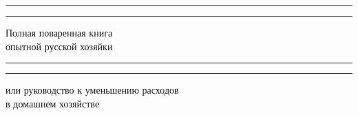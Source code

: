 \documentclass[a4paper,12pt]{extbook}
\begin{document}
\begin{titlepage} %

	\centering %
	
	\scshape %
	
	\vspace*{\baselineskip} %
	
	
	\rule{\textwidth}{1.6pt}\vspace*{-\baselineskip}\vspace*{2pt} %
	\rule{\textwidth}{0.4pt} %
	
	\vspace{0.75\baselineskip} %
	
	{\LARGE  Полная поваренная книга \\ опытной русской хозяйки } %
	
	\vspace{0.75\baselineskip} %
	
	\rule{\textwidth}{0.4pt}\vspace*{-\baselineskip}\vspace{3.2pt} %
	\rule{\textwidth}{1.6pt} %
	
	\vspace{2\baselineskip} %
	
	
	или руководство к уменьшению расходов \\ в домашнем хозяйстве %
	
	\vspace*{3\baselineskip} %
	
	
	
	\vspace{0.5\baselineskip} %
	

\end{titlepage}
\end{document}

